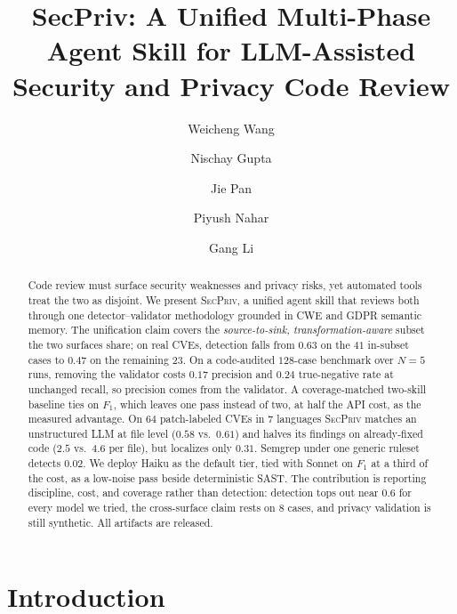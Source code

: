 \documentclass[runningheads]{llncs}
\begin{document}
\title{SecPriv: A Unified Multi-Phase Agent Skill for LLM-Assisted Security and Privacy Code Review}

\author{Weicheng Wang \and Nischay Gupta \and Jie Pan \and Piyush Nahar \and Gang Li}
\maketitle

\begin{abstract}
Code review must surface security weaknesses and privacy risks, yet automated tools treat the two as disjoint. We present \textsc{SecPriv}, a unified agent skill that reviews both through one detector--validator methodology grounded in CWE and GDPR semantic memory. The unification claim covers the \emph{source-to-sink, transformation-aware} subset the two surfaces share; on real CVEs, detection falls from $0.63$ on the $41$ in-subset cases to $0.47$ on the remaining $23$. On a code-audited $128$-case benchmark over $N{=}5$ runs, removing the validator costs $0.17$ precision and $0.24$ true-negative rate at unchanged recall, so precision comes from the validator. A coverage-matched two-skill baseline ties on $F_1$, which leaves one pass instead of two, at half the API cost, as the measured advantage. On $64$ patch-labeled CVEs in $7$ languages \textsc{SecPriv} matches an unstructured LLM at file level ($0.58$ vs.\ $0.61$) and halves its findings on already-fixed code ($2.5$ vs.\ $4.6$ per file), but localizes only $0.31$. Semgrep under one generic ruleset detects $0.02$. We deploy Haiku as the default tier, tied with Sonnet on $F_1$ at a third of the cost, as a low-noise pass beside deterministic SAST. The contribution is reporting discipline, cost, and coverage rather than detection: detection tops out near $0.6$ for every model we tried, the cross-surface claim rests on $8$ cases, and privacy validation is still synthetic. All artifacts are released.
\end{abstract}

\sloppy

\section{Introduction}
\end{document}
